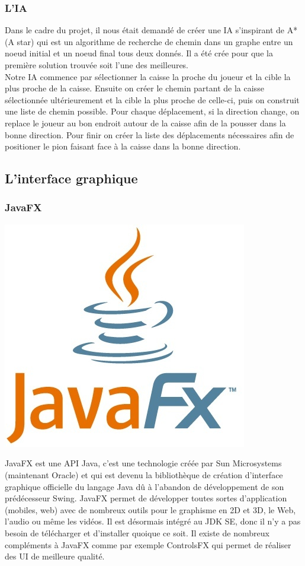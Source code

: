\documentclass[a4paper,12pt]{article} %
\begin{document}
		\subsubsection{L'IA}
		Dans le cadre du projet, il nous était demandé de créer une IA s'inspirant de A* (A star) qui est un algorithme de recherche de chemin dans un graphe entre un noeud initial et un noeud final tous deux donnés. Il a été crée pour que la première solution trouvée soit l'une des meilleures.\\
		Notre IA commence par sélectionner la caisse la proche du joueur et la cible la plus proche de la caisse. Ensuite on créer le chemin partant de la caisse sélectionnée ultérieurement et la cible la plus proche de celle-ci, puis on construit une liste de chemin possible. Pour chaque déplacement, si la direction change, on replace le joueur au bon endroit autour de la caisse afin de la pousser dans la bonne direction. Pour finir on créer la liste des déplacements nécessaires afin de positioner le pion faisant face à la caisse dans la bonne direction.\\
	

	\subsection{L'interface graphique}
		\subsubsection{JavaFX}
		\begin{center}
		\includegraphics[scale=0.3]{javafx_logo.jpg}
		\end{center}
		JavaFX est une API Java, c'est une technologie créée par Sun Microsystems (maintenant Oracle) et qui est devenu la bibliothèque de création d'interface graphique officielle du langage Java dû à l'abandon de développement de son prédécesseur Swing. JavaFX permet de développer toutes sortes d'application (mobiles, web) avec de nombreux outils pour le graphisme en 2D et 3D, le Web, l'audio ou même les vidéos. Il est désormais intégré au JDK SE, donc il n'y a pas besoin de télécharger et d'installer quoique ce soit. Il existe de nombreux compléments à JavaFX comme par exemple ControlsFX qui permet de réaliser des UI de meilleure qualité.
		
\end{document}
